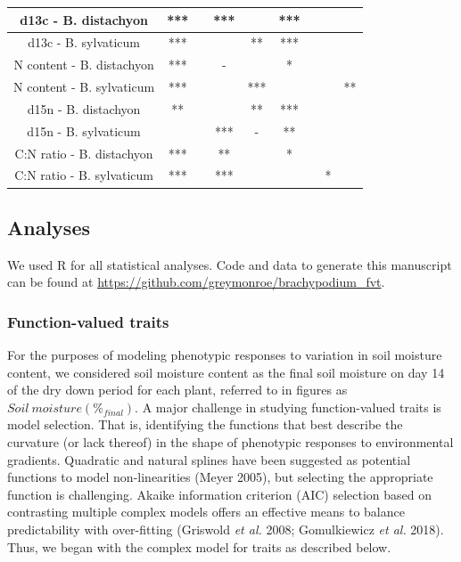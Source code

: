 \documentclass[jou,floatsintext]{apa6}
\begin{document}
\begin{table}[tbp]
\begin{center}
\begin{threeparttable}
{\begin{tabular}{ccccccccc}
d13c - B. distachyon & *** &  & *** &  & *** &  &  & \\ \midrule
d13c - B. sylvaticum & *** &  &  & ** & *** &  &  & \\ \midrule
N content - B. distachyon & *** &  & - &  & * &  &  & \\ \midrule
N content - B. sylvaticum & *** &  &  & *** &  &  &  & **\\ \midrule
d15n - B. distachyon & ** &  &  & ** & *** &  &  & \\ \midrule
d15n - B. sylvaticum &  &  & *** & - & ** &  &  & \\ \midrule
C:N ratio - B. distachyon & *** &  & ** &  & * &  &  & \\ \midrule
C:N ratio - B. sylvaticum & *** &  & *** &  &  &  & * & \\ \midrule
\bottomrule
\end{tabular}
}
\end{threeparttable}
\end{center}
\end{table}

\hypertarget{analyses}{%
\subsection{Analyses}\label{analyses}}

We used R for all statistical analyses. Code and data to generate this manuscript can be found at \url{https://github.com/greymonroe/brachypodium_fvt}.

\hypertarget{function-valued-traits}{%
\subsubsection{Function-valued traits}\label{function-valued-traits}}

For the purposes of modeling phenotypic responses to variation in soil moisture content, we considered soil moisture content as the final soil moisture on day 14 of the dry down period for each plant, referred to in figures as \(Soil\  moisture (\%_{final})\). A major challenge in studying function-valued traits is model selection. That is, identifying the functions that best describe the curvature (or lack thereof) in the shape of phenotypic responses to environmental gradients. Quadratic and natural splines have been suggested as potential functions to model non-linearities (Meyer 2005), but selecting the appropriate function is challenging. Akaike information criterion (AIC) selection based on contrasting multiple complex models offers an effective means to balance predictability with over-fitting (Griswold \emph{et al.} 2008; Gomulkiewicz \emph{et al.} 2018). Thus, we began with the complex model for traits as described below.
\end{document}
